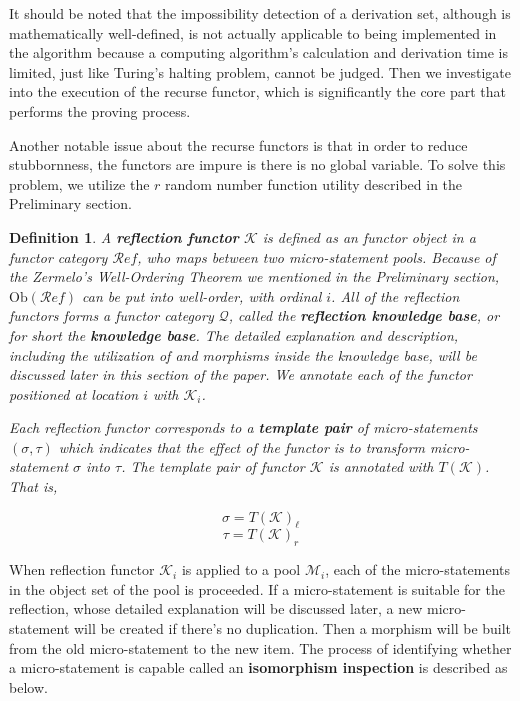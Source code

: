 \documentclass{article}
\newtheorem{definition}{Definition}
\begin{document}
It should be noted that the impossibility detection of a derivation set, although is mathematically well-defined, is not actually applicable to being implemented in the algorithm because a computing algorithm{'}s calculation and derivation time is limited, just like Turing{'}s halting problem, cannot be judged. Then we investigate into the execution of the recurse functor, which is significantly the core part that performs the proving process.

Another notable issue about the recurse functors is that in order to reduce stubbornness, the functors are impure is there is no global variable. To solve this problem, we utilize the \(\mathit{r}\) random number function utility described in the Preliminary section.

\begin{definition}
	A \textbf{ reflection functor} \(\mathcal{K}\) is defined as an functor object in a functor category \(\mathcal{R}\mathit{e}\mathit{f}\), who maps between two micro-statement pools. Because of the Zermelo{'}s Well-Ordering Theorem we mentioned in the Preliminary section, \(\text{Ob}(\mathcal{R}\mathit{e}\mathit{f})\) can be put into well-order, with ordinal \(i\). All of the reflection functors forms a functor category \(\mathcal{Q}\), called the \textbf{ reflection knowledge base}, or for short the \textbf{ knowledge base}. The detailed explanation and description, including the utilization of and morphisms inside the knowledge base, will be discussed later in this section of the paper. We annotate each of the functor positioned at location \(i\) with \(\mathcal{K}_i\).
	
	Each reflection functor corresponds to a \textbf{ template pair} of micro-statements \((\sigma ,\tau )\) which indicates that the effect of the functor is to transform micro-statement \(\sigma\) into $\tau $. The template pair of functor \(\mathcal{K}\) is annotated with \(T(\mathcal{K})\). That
	is,
	
	\[\sigma =T(\mathcal{K})_{\ell }\]
	\[\tau =T(\mathcal{K})_{\mathit{r}}\]
\end{definition}

When reflection functor \(\mathcal{K}_i\) is applied to a pool \(\mathcal{M}_i\), each of the micro-statements in the object set of the pool is proceeded. If a micro-statement is suitable for the reflection, whose detailed explanation will be discussed later, a new micro-statement will be created if there{'}s no duplication. Then a morphism will be built from the old micro-statement to the new item. The process of identifying whether a micro-statement is capable called an \textbf{ isomorphism inspection} is described as below.
\end{document}
